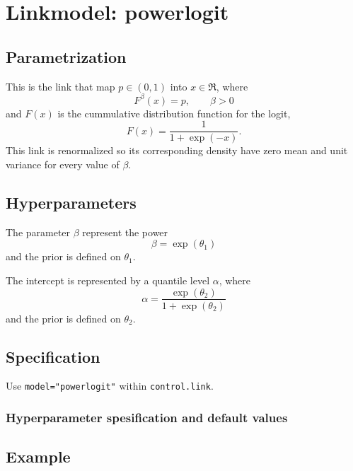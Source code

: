 \documentclass[a4paper,11pt]{article}
\begin{document}
\section*{Linkmodel: powerlogit}

\subsection*{Parametrization}

This is the link that map $p\in (0,1)$ into $x\in\Re$, where
\begin{displaymath}
    F^{\beta}(x) = p, \qquad \beta > 0
\end{displaymath}
and $F(x)$ is the cummulative distribution function for the
logit,
\begin{displaymath}
    F(x) = \frac{1}{1+\exp(-x)}.
\end{displaymath}
This link is renormalized so its corresponding density have zero mean
and unit variance for every value of $\beta$.

\subsection*{Hyperparameters}

The parameter $\beta$ represent the power
\begin{displaymath}
    \beta = \exp(\theta_1)
\end{displaymath}
and the prior is defined on $\theta_1$. 

The intercept is represented by a quantile level $\alpha$, where
\begin{displaymath}
    \alpha = \frac{\exp(\theta_2)}{1 + \exp(\theta_2)}
\end{displaymath}
and the prior is defined on $\theta_2$.

\subsection*{Specification}

Use \texttt{model="powerlogit"} within \texttt{control.link}.  

\subsubsection*{Hyperparameter spesification and default values}


\subsection*{Example}
\end{document}
